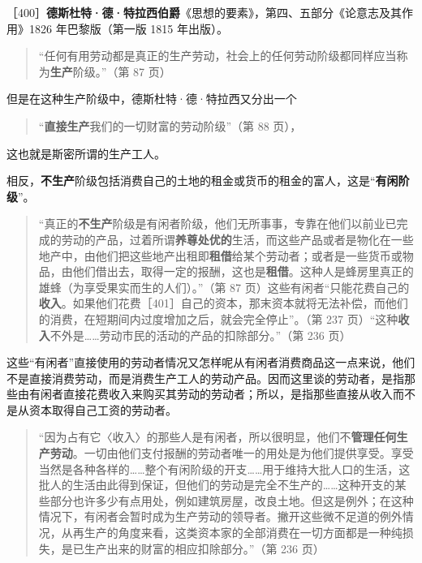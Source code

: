 
［400］\textbf{德斯杜特·德·特拉西伯爵}《思想的要素》，第四、五部分《论意志及其作用》1826 年巴黎版（第一版 1815 年出版）。

\begin{quote}“任何有用劳动都是真正的生产劳动，社会上的任何劳动阶级都同样应当称为\textbf{生产}阶级。”（第 87 页）\end{quote}

但是在这种生产阶级中，德斯杜特·德·特拉西又分出一个

\begin{quote}“\textbf{直接生产}我们的一切财富的劳动阶级”（第 88 页），\end{quote}

这也就是斯密所谓的生产工人。

相反，\textbf{不生产}阶级包括消费自己的土地的租金或货币的租金的富人，这是“\textbf{有闲阶级}”。

\begin{quote}“真正的\textbf{不生产}阶级是有闲者阶级，他们无所事事，专靠在他们以前业已完成的劳动的产品，过着所谓\textbf{养尊处优的}生活，而这些产品或者是物化在一些地产中，由他们把这些地产出租即\textbf{租借}给某个劳动者；或者是一些货币或物品，由他们借出去，取得一定的报酬，这也是\textbf{租借}。这种人是蜂房里真正的雄蜂（为享受果实而生的人们）。”（第 87 页）这些有闲者“只能花费自己的\textbf{收入}。如果他们花费［401］自己的资本，那末资本就将无法补偿，而他们的消费，在短期间内过度增加之后，就会完全停止”。（第 237 页）“这种\textbf{收入}不外是……劳动市民的活动的产品的扣除部分。”（第 236 页）\end{quote}

这些“有闲者”直接使用的劳动者情况又怎样呢从有闲者消费商品这一点来说，他们不是直接消费劳动，而是消费生产工人的劳动产品。因而这里谈的劳动者，是指那些由有闲者直接花费收入来购买其劳动的劳动者；所以，是指那些直接从收入而不是从资本取得自己工资的劳动者。

\begin{quote}“因为占有它〈收入〉的那些人是有闲者，所以很明显，他们不\textbf{管理任何生产劳动}。一切由他们支付报酬的劳动者唯一的用处是为他们提供享受。享受当然是各种各样的……整个有闲阶级的开支……用于维持大批人口的生活，这批人的生活由此得到保证，但他们的劳动是完全不生产的……这种开支的某些部分也许多少有点用处，例如建筑房屋，改良土地。但这是例外；在这种情况下，有闲者会暂时成为生产劳动的领导者。撇开这些微不足道的例外情况，从再生产的角度来看，这类资本家的全部消费在一切方面都是一种纯损失，是已生产出来的财富的相应扣除部分。”（第 236 页）\end{quote}

